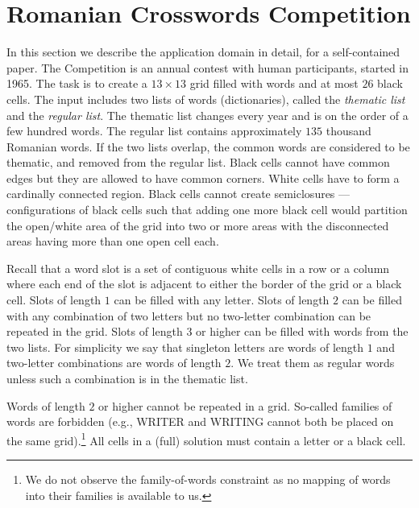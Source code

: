 \section{Romanian Crosswords Competition}
\label{sec::roco}


In this section we describe the application domain in detail,
for a self-contained paper.
The Competition is an annual contest with human participants, started in 1965.
The task is to create a $13\times13$ grid filled with words and
at most $26$ black cells.
The input includes two lists of words (dictionaries), called the \emph{thematic list}
and the \emph{regular list}.
The thematic list changes every year and is on the order of a few hundred words.
The regular list contains approximately $135$ thousand Romanian words.
If the two lists overlap, the common words 
are considered to be thematic, and removed from the regular list.
Black cells cannot have common edges but they are allowed to have common corners. 
White cells have to form a cardinally connected region. Black cells cannot create semiclosures --- configurations of black cells such that
adding one more black cell would partition the open/white area of the grid into two or more
areas with the disconnected areas having more than one open cell each.

Recall that a {word slot}
is a set of contiguous white cells in a row or a column
where each end of the slot is adjacent to either the 
border of the grid or a black cell.
%
Slots of length $1$ can be filled with any letter.
Slots of length $2$ can be filled with any combination of two letters
but no two-letter combination can be repeated in the grid.
Slots of length $3$ or higher can be filled with words from the two lists.
For simplicity we say that singleton letters are words
of length $1$ and two-letter combinations are words of length $2$.
We treat them as regular words unless such a combination is in the thematic list.%

Words of length $2$ or higher cannot be repeated in a grid.
So-called families of words are forbidden (e.g., 
WRITER and WRITING cannot both be placed on the same grid).\footnote{We do not observe the family-of-words constraint as no mapping of words into their families is available to us.}
All cells in a (full) solution must contain a letter or a black cell.

